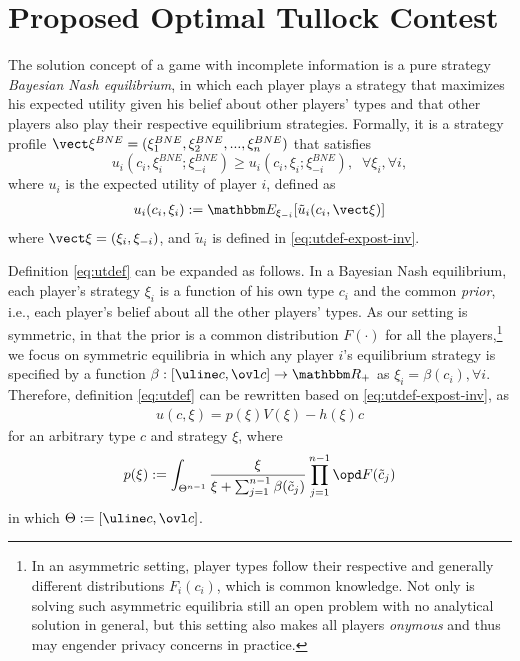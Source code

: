 \documentclass{sig-alternate-10pt}
\begin{document}
\section{Proposed Optimal Tullock Contest}\label{sec:analysis}

The solution concept of a game with incomplete information is a pure strategy {\em Bayesian Nash equilibrium}, in which each player plays a strategy that maximizes his expected utility given his belief about other players' types and that other players also play their respective equilibrium strategies. Formally, it is a strategy profile $\vect \xi^{BNE}=(\xi_1^{BNE},\xi_2^{BNE},...,\xi_n^{BNE})$ that satisfies
\[ u_i(c_i,\xi_i^{BNE};\xi_{-i}^{BNE}) \ge u_i(c_i,\xi_i;\xi_{-i}^{BNE}), \;\; \forall \xi_i, \forall i, \]
where $u_i$ is the expected utility of player $i$, defined as
\begin{align}\label{eq:utdef}
u_i(c_i,\xi_i) := \mathbbm E_{\xi_{-i}}[\tilde u_i(c_i, \vect \xi)]
\end{align}
where $\vect \xi=(\xi_i,\xi_{-i})$, and $\tilde u_i$ is defined in \eqref{eq:utdef-expost-inv}. 

Definition \eqref{eq:utdef} can be expanded as follows. In a Bayesian Nash equilibrium, each player's strategy $\xi_i$ is a function of his own type $c_i$ and the common {\em prior}, i.e., each player's belief about all the other players' types. As our setting is symmetric, in that the prior is a common distribution $F(\cdot)$ for all the players,\footnote{In an asymmetric setting, player types follow their respective and generally different distributions $F_i(c_i)$, which is common knowledge. Not only is solving such asymmetric equilibria still an open problem with no analytical solution in general\cite{Konrad09book}, but this setting also makes all players {\em onymous} and thus may engender privacy concerns in practice. } we focus on symmetric equilibria in which any player $i$'s equilibrium strategy is specified by a function $\beta:[\uline c,\ovl c]\rightarrow \mathbbm R_+$ as $\xi_i=\beta(c_i), \forall i$.
Therefore, definition \eqref{eq:utdef} can be rewritten based on \eqref{eq:utdef-expost-inv}, as
\begin{align}\label{eq:ut}
u(c,\xi) = p(\xi) V(\xi)  - h(\xi) c
\end{align}
for an arbitrary type $c$ and strategy $\xi$, where 
\begin{align}\label{eq:winprob}
p(\xi) := \int_{\Theta^{n-1}} \frac{\xi}{\xi + \sum_{j=1}^{n-1} \beta(\tilde c_j)} 
								\prod_{j=1}^{n-1} \opd F(\tilde c_j)
\end{align}
in which $\Theta := [\uline c, \ovl c]$. 
\end{document}
